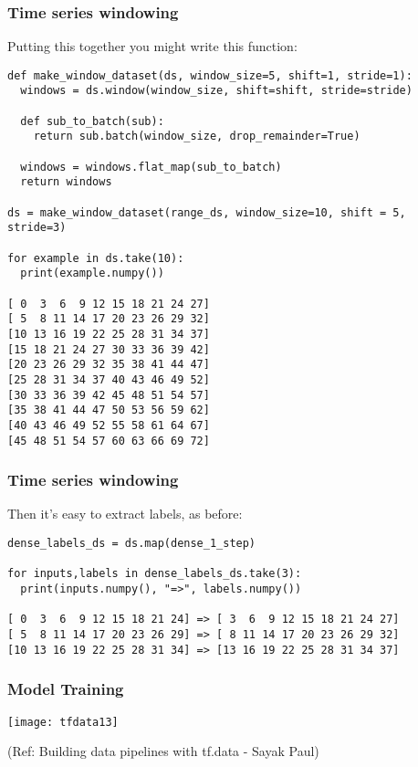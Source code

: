 \begin{frame}[fragile]\frametitle{Time series windowing}

Putting this together you might write this function:

\begin{lstlisting}
def make_window_dataset(ds, window_size=5, shift=1, stride=1):
  windows = ds.window(window_size, shift=shift, stride=stride)

  def sub_to_batch(sub):
    return sub.batch(window_size, drop_remainder=True)

  windows = windows.flat_map(sub_to_batch)
  return windows

ds = make_window_dataset(range_ds, window_size=10, shift = 5, stride=3)

for example in ds.take(10):
  print(example.numpy())
	
[ 0  3  6  9 12 15 18 21 24 27]
[ 5  8 11 14 17 20 23 26 29 32]
[10 13 16 19 22 25 28 31 34 37]
[15 18 21 24 27 30 33 36 39 42]
[20 23 26 29 32 35 38 41 44 47]
[25 28 31 34 37 40 43 46 49 52]
[30 33 36 39 42 45 48 51 54 57]
[35 38 41 44 47 50 53 56 59 62]
[40 43 46 49 52 55 58 61 64 67]
[45 48 51 54 57 60 63 66 69 72]
\end{lstlisting}
\end{frame}

\begin{frame}[fragile]\frametitle{Time series windowing}

Then it's easy to extract labels, as before:


\begin{lstlisting}
dense_labels_ds = ds.map(dense_1_step)

for inputs,labels in dense_labels_ds.take(3):
  print(inputs.numpy(), "=>", labels.numpy())
	
[ 0  3  6  9 12 15 18 21 24] => [ 3  6  9 12 15 18 21 24 27]
[ 5  8 11 14 17 20 23 26 29] => [ 8 11 14 17 20 23 26 29 32]
[10 13 16 19 22 25 28 31 34] => [13 16 19 22 25 28 31 34 37]
\end{lstlisting}
\end{frame}

\begin{frame}[fragile]\frametitle{Model Training}

\begin{center}
\texttt{[image: tfdata13]}

{\tiny (Ref: Building data pipelines with tf.data - Sayak Paul)}

\end{center}
\end{frame}

